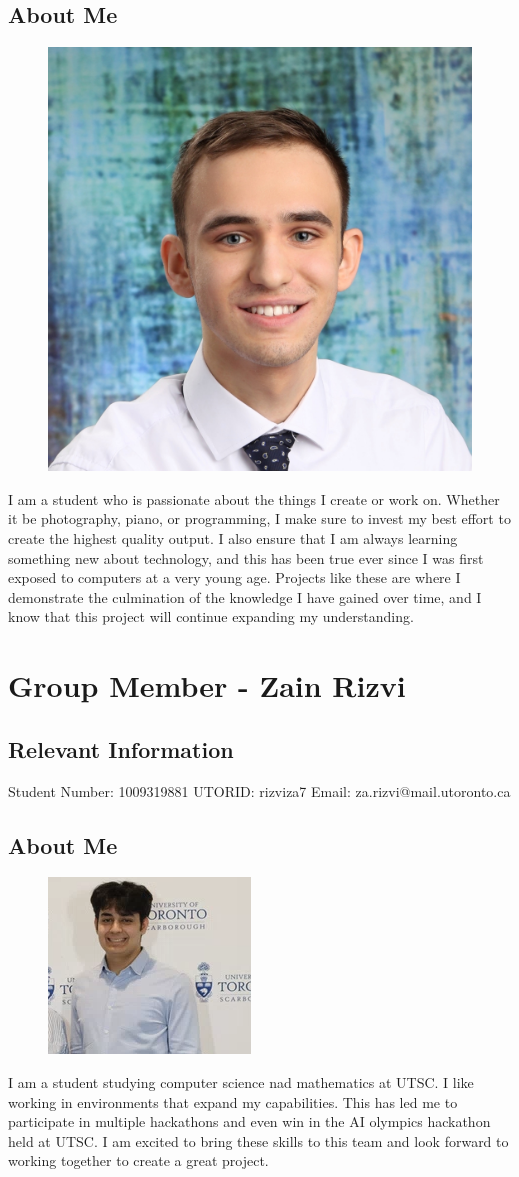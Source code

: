 \documentclass{article}
\begin{document}
\subsection{About Me}
\begin{figure}[h]
    \centering
    \includegraphics[width=0.25\linewidth]{images/SebPhoto.jpg}
\end{figure}
I am a student who is passionate about the things I create or work on. Whether it be photography, piano, or programming, I make sure to invest my best effort to create the highest quality output. I also ensure that I am always learning something new about technology, and this has been true ever since I was first exposed to computers at a very young age. Projects like these are where I demonstrate the culmination of the knowledge I have gained over time, and I know that this project will continue expanding my understanding.

\noindent\makebox[\linewidth]{\rule{\paperwidth}{0.4pt}}

\section{Group Member - Zain Rizvi}
\subsection{Relevant Information}
    Student Number: 1009319881  \newline
    UTORID: rizviza7  \newline
    Email: za.rizvi@mail.utoronto.ca
\subsection{About Me}
\begin{figure}[h]
    \centering
    \includegraphics[width=0.25\linewidth]{images/ZainRizvi.png}
\end{figure}
I am a student studying computer science nad mathematics at UTSC. I like working in environments that expand my capabilities. This has led me to participate in multiple hackathons and even win in the AI olympics hackathon held at UTSC. I am excited to bring these skills to this team and look forward to working together to create a great project.
\end{document}
